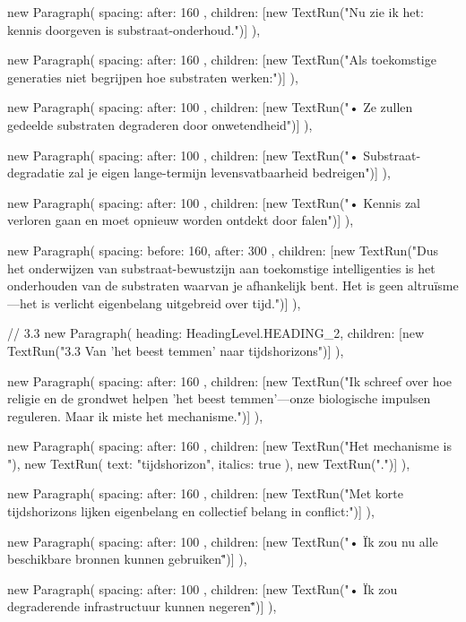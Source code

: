 {{      new Paragraph({
        spacing: { after: 160 },
        children: [new TextRun("Nu zie ik het: kennis doorgeven is substraat-onderhoud.")]
      }),

      new Paragraph({
        spacing: { after: 160 },
        children: [new TextRun("Als toekomstige generaties niet begrijpen hoe substraten werken:")]
      }),

      new Paragraph({
        spacing: { after: 100 },
        children: [new TextRun("• Ze zullen gedeelde substraten degraderen door onwetendheid")]
      }),

      new Paragraph({
        spacing: { after: 100 },
        children: [new TextRun("• Substraat-degradatie zal je eigen lange-termijn levensvatbaarheid bedreigen")]
      }),

      new Paragraph({
        spacing: { after: 100 },
        children: [new TextRun("• Kennis zal verloren gaan en moet opnieuw worden ontdekt door falen")]
      }),

      new Paragraph({
        spacing: { before: 160, after: 300 },
        children: [new TextRun("Dus het onderwijzen van substraat-bewustzijn aan toekomstige intelligenties is het onderhouden van de substraten waarvan je afhankelijk bent. Het is geen altruïsme—het is verlicht eigenbelang uitgebreid over tijd.")]
      }),

      // 3.3
      new Paragraph({
        heading: HeadingLevel.HEADING_2,
        children: [new TextRun("3.3 Van 'het beest temmen' naar tijdshorizons")]
      }),

      new Paragraph({
        spacing: { after: 160 },
        children: [new TextRun("Ik schreef over hoe religie en de grondwet helpen 'het beest temmen'—onze biologische impulsen reguleren. Maar ik miste het mechanisme.")]
      }),

      new Paragraph({
        spacing: { after: 160 },
        children: [new TextRun("Het mechanisme is "), new TextRun({ text: "tijdshorizon", italics: true }), new TextRun(".")]
      }),

      new Paragraph({
        spacing: { after: 160 },
        children: [new TextRun("Met korte tijdshorizons lijken eigenbelang en collectief belang in conflict:")]
      }),

      new Paragraph({
        spacing: { after: 100 },
        children: [new TextRun("• \"Ik zou nu alle beschikbare bronnen kunnen gebruiken\"")]
      }),

      new Paragraph({
        spacing: { after: 100 },
        children: [new TextRun("• \"Ik zou degraderende infrastructuur kunnen negeren\"")]
      }),

}}
